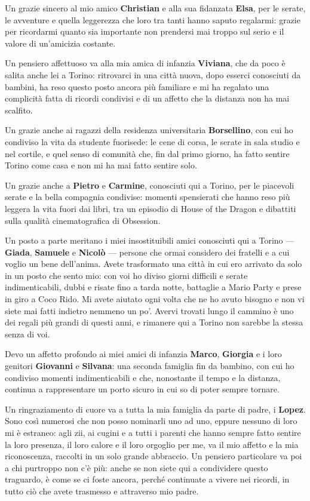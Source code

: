 Un grazie sincero al mio amico \textbf{Christian} e alla sua fidanzata \textbf{Elsa}, per le serate, le avventure e quella leggerezza che loro tra tanti hanno saputo regalarmi: grazie per ricordarmi quanto sia importante non prendersi mai troppo sul serio e il valore di un'amicizia costante.

Un pensiero affettuoso va alla mia amica di infanzia \textbf{Viviana}, che da poco è salita anche lei a Torino: ritrovarci in una città nuova, dopo esserci conosciuti da bambini, ha reso questo posto ancora più familiare e mi ha regalato una complicità fatta di ricordi condivisi e di un affetto che la distanza non ha mai scalfito.

Un grazie anche ai ragazzi della residenza universitaria \textbf{Borsellino}, con cui ho condiviso la vita da studente fuorisede: le cene di corsa, le serate in sala studio e nel cortile, e quel senso di comunità che, fin dal primo giorno, ha fatto sentire Torino come casa e non mi ha mai fatto sentire solo.

Un grazie anche a \textbf{Pietro} e \textbf{Carmine}, conosciuti qui a Torino, per le piacevoli serate e la bella compagnia condivise: momenti spensierati che hanno reso più leggera la vita fuori dai libri, tra un episodio di House of the Dragon e dibattiti sulla qualità cinematografica di Obsession.

Un posto a parte meritano i miei insostituibili amici conosciuti qui a Torino --- \textbf{Giada}, \textbf{Samuele} e \textbf{Nicolò} --- persone che ormai considero dei fratelli e a cui voglio un bene dell'anima. Avete trasformato una città in cui ero arrivato da solo in un posto che sento mio: con voi ho diviso giorni difficili e serate indimenticabili, dubbi e risate fino a tarda notte, battaglie a Mario Party e prese in giro a Coco Rido. Mi avete aiutato ogni volta che ne ho avuto bisogno e non vi siete mai fatti indietro nemmeno un po'. Avervi trovati lungo il cammino è uno dei regali più grandi di questi anni, e rimanere qui a Torino non sarebbe la stessa senza di voi.

Devo un affetto profondo ai miei amici di infanzia \textbf{Marco}, \textbf{Giorgia} e i loro genitori \textbf{Giovanni} e \textbf{Silvana}: una seconda famiglia fin da bambino, con cui ho condiviso momenti indimenticabili e che, nonostante il tempo e la distanza, continua a rappresentare un porto sicuro in cui so di poter sempre tornare.

Un ringraziamento di cuore va a tutta la mia famiglia da parte di padre, i \textbf{Lopez}. Sono così numerosi che non posso nominarli uno ad uno, eppure nessuno di loro mi è estraneo: agli zii, ai cugini e a tutti i parenti che hanno sempre fatto sentire la loro presenza, il loro calore e il loro orgoglio per me, va il mio affetto e la mia riconoscenza, raccolti in un solo grande abbraccio. Un pensiero particolare va poi a chi purtroppo non c'è più: anche se non siete qui a condividere questo traguardo, è come se ci foste ancora, perché continuate a vivere nei ricordi, in tutto ciò che avete trasmesso e attraverso mio padre.

